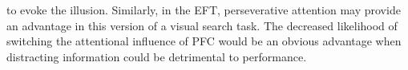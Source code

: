 to evoke the illusion.  Similarly, in the EFT, perseverative attention may provide an advantage in this version of a visual search task.  The decreased likelihood of switching the attentional influence of PFC would be an obvious advantage when distracting information could be detrimental to performance.





